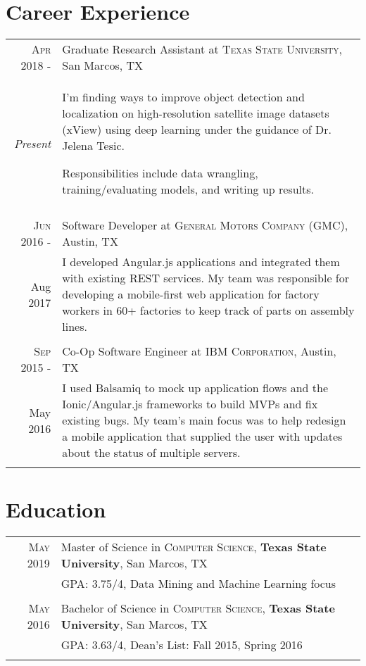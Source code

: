 \documentclass[a4paper,10pt]{article}
\begin{document}
\section{Career Experience}
\begin{tabular}{r|p{12cm}}
\textsc{Apr 2018 -} & Graduate Research Assistant at \textsc{Texas State University}, San Marcos, TX \\
\emph{Present} & \footnotesize{I'm finding ways to improve object detection and localization on high-resolution satellite image datasets (xView) using deep learning under the guidance of Dr. Jelena Tesic.
 
 	Responsibilities include data wrangling, training/evaluating models, and writing up results.} \\
 \multicolumn{2}{c}{} \\
 
 \textsc{Jun 2016 -} & Software Developer at \textsc{General Motors Company (GMC)}, Austin, TX \\
Aug 2017 & \footnotesize{I developed Angular.js applications and integrated them with existing REST services. My team was responsible for developing a mobile-first web application for factory workers in 60+ factories to keep track of parts on assembly lines.
} \\
 \multicolumn{2}{c}{} \\
 
 \textsc{Sep 2015 -} & Co-Op Software Engineer at \textsc{IBM Corporation}, Austin, TX \\
 May 2016 & \footnotesize{I used Balsamiq to mock up application flows and the Ionic/Angular.js frameworks to build MVPs and fix existing bugs. My team's main focus was to help redesign a mobile application that supplied the user with updates about the status of multiple servers.} \\
 \multicolumn{2}{c}{} \\
\end{tabular}

\section{Education}
\begin{tabular}{rl}	
 \textsc{May} 2019 & Master of Science in \textsc{Computer Science}, \textbf{Texas State University}, San Marcos, TX\\
 
&\normalsize \textsc{GPA}: 3.75/4, Data Mining and Machine Learning focus \\ & \\

\textsc{May} 2016 & Bachelor of Science in \textsc{Computer Science}, \textbf{Texas State University}, San Marcos, TX \\

&\normalsize \textsc{GPA}: 3.63/4, Dean’s List: Fall 2015, Spring 2016 \\&\\
\end{tabular}
\end{document}
